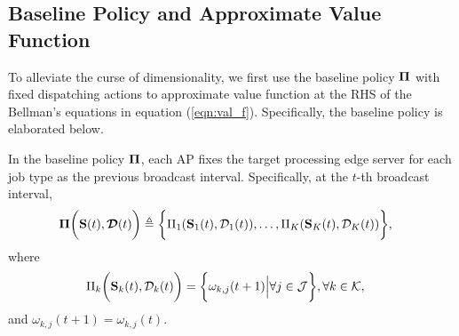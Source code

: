 \subsection{Baseline Policy and Approximate Value Function}
\label{subsec:baseline}
To alleviate the curse of dimensionality, we first use the baseline policy $\boldsymbol{\Pi}$ with fixed dispatching actions to approximate value function at the RHS of the Bellman's equations in equation (\ref{eqn:val_f}).
Specifically, the baseline policy is elaborated below.

\begin{definition}
    In the baseline policy $\boldsymbol{\Pi}$, each AP fixes the target processing edge server for each job type as the previous broadcast interval. Specifically, at the $t$-th broadcast interval,
    {\small
    \begin{align}
        \boldsymbol{\Pi}\bigg(\mathbf{S}(t),\boldsymbol{\mathcal{D}}(t)\bigg) &\triangleq \bigg\{ 
            \Pi_{1}(\mathbf{S}_{1}(t),\mathcal{D}_{1}(t)),
            \dots,
            \Pi_{K}(\mathbf{S}_{K}(t),\mathcal{D}_{K}(t))
        \bigg\},
    \end{align}
    }
    where
    {\small
    \begin{align}
        \Pi_{k}\bigg(\mathbf{S}_{k}(t),\mathcal{D}_{k}(t)\bigg)
        &= \bigg\{
            {\omega}_{k,j}(t+1) \Big| \forall j\in\mathcal{J}
        \bigg\}, \forall k\in\mathcal{K},
    \end{align}
    }
    and $\omega_{k,j}(t+1) = \omega_{k,j}(t)$.
\end{definition}

%

